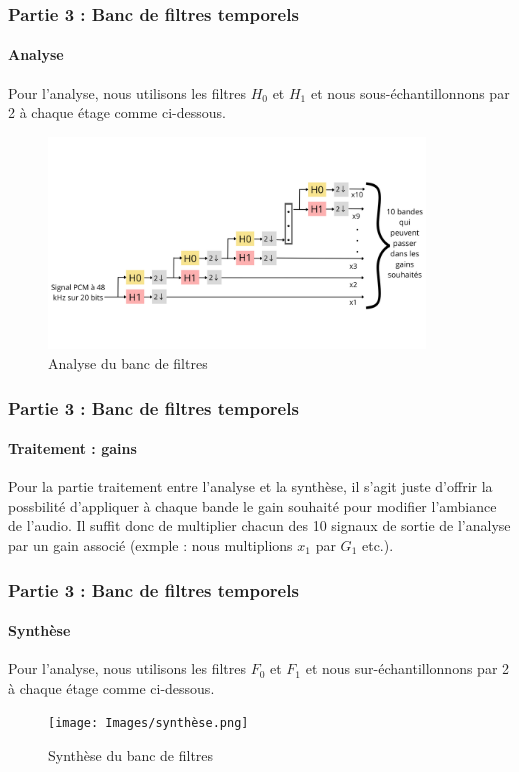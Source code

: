 \documentclass[
10pt,
aspectratio=169,
]{beamer}
\begin{document}
\begin{frame}
\frametitle{Partie 3 : Banc de filtres temporels} 
\framesubtitle{Analyse}
Pour l'analyse, nous utilisons les filtres $H_0$ et $H_1$ et nous sous-échantillonnons par 2 à chaque étage comme ci-dessous.
\begin{figure}
    \centering
    \includegraphics[width=10cm]{Images/analyse.png}
    \caption{Analyse du banc de filtres}
\end{figure}
\end{frame}

\begin{frame}
\frametitle{Partie 3 : Banc de filtres temporels} 
\framesubtitle{Traitement : gains}
Pour la partie traitement entre l'analyse et la synthèse, il s'agit juste d'offrir la possbilité d'appliquer à chaque bande le gain souhaité pour modifier l'ambiance de l'audio. Il suffit donc de multiplier chacun des 10 signaux de sortie de l'analyse par un gain associé (exmple : nous multiplions $x_1$ par $G_1$ etc.).
\end{frame}

\begin{frame}
\frametitle{Partie 3 : Banc de filtres temporels} 
\framesubtitle{Synthèse}
Pour l'analyse, nous utilisons les filtres $F_0$ et $F_1$ et nous sur-échantillonnons par 2 à chaque étage comme ci-dessous.
\begin{figure}
    \centering
    \texttt{[image: Images/synthèse.png]}
    \caption{Synthèse du banc de filtres}
\end{figure}
\end{frame}
\end{document}
